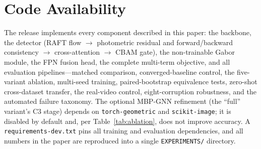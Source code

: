 \section*{Code Availability}
The release implements every component described in this paper: the \dinov{}
backbone, the \ofcv{} detector (RAFT flow $\rightarrow$ photometric residual and
forward/backward consistency $\rightarrow$ cross-attention $\rightarrow$ CBAM
gate), the non-trainable \brf{} Gabor module, the FPN fusion head, the complete
multi-term objective, and all evaluation pipelines---matched comparison,
converged-baseline control, the five-variant ablation, multi-seed training,
paired-bootstrap equivalence tests, zero-shot cross-dataset transfer, the
real-video control, eight-corruption robustness, and the automated failure
taxonomy. The optional MBP-GNN refinement (the ``full'' variant's C3 stage)
depends on \texttt{torch-geometric} and \texttt{scikit-image}; it is disabled by
default and, per Table~\ref{tab:ablation}, does not improve accuracy. A
\texttt{requirements-dev.txt} pins all training and evaluation dependencies, and
all numbers in the paper are reproduced into a single \texttt{EXPERIMENTS/}
directory.

